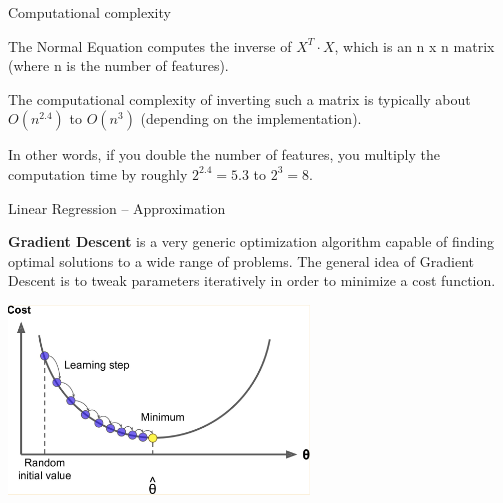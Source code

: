\documentclass{beamer}
\begin{document}






\begin{frame}
{\centerline{Computational complexity}}

The Normal Equation computes the inverse of $X^T \cdot X$, which is an n x n matrix (where n is the number of features). 
\newline

The computational complexity of inverting such a matrix is typically about $O( n^{2.4})$ to $O( n^3)$ (depending on the implementation). 
\newline

In other words, if you double the number of features, you multiply the computation time by roughly $2^{2.4} = 5.3$ to $2^3 = 8$.

\end{frame}


\begin{frame}
{\centerline{Linear Regression -- Approximation}}

\textbf{Gradient Descent} is a very generic optimization algorithm capable of finding optimal solutions to a wide range of problems. The general idea of Gradient Descent is to tweak parameters iteratively in order to minimize a cost function.

\begin{center}
\includegraphics[width=8cm]{P2023.AIBCCSS.FoundationsDataScience/gd-1.png}
\end{center}


\end{frame}
\end{document}
